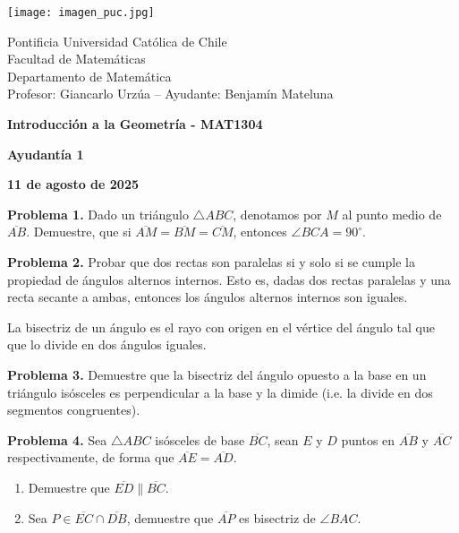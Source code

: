 \documentclass{article}
\begin{document}
\begin{minipage}{2.5cm}
    \texttt{[image: imagen\_puc.jpg]}
\end{minipage}
\begin{minipage}{14cm}
    {\sc Pontificia Universidad Católica de Chile\\
    Facultad de Matemáticas\\
    Departamento de Matemática\\
    Profesor: Giancarlo Urzúa -- Ayudante: Benjamín Mateluna}
\end{minipage}
\vspace{1ex}

{\centerline{\bf Introducción a la Geometría - MAT1304}
\centerline{\bf Ayudantía 1}}
\centerline{\bf 11 de agosto de 2025}

\vspace{1cm}
\noindent\textbf{Problema 1.} Dado un triángulo $\triangle ABC$, denotamos por $M$ al punto medio
de $\overline{AB}$. Demuestre, que si $\overline{AM}=\overline{BM}=\overline{CM}$, entonces 
$\angle BCA=90^{\circ}$.

\vspace{5mm}
\noindent\textbf{Problema 2.} Probar que dos rectas son paralelas si y solo si se cumple la 
propiedad de ángulos alternos internos. Esto es, dadas dos rectas paralelas y una recta secante a
ambas, entonces los ángulos alternos internos son iguales.

\vspace{5mm}
\begin{dfn}
    La bisectriz de un ángulo es el rayo con origen en el vértice del ángulo tal que que lo divide 
    en dos ángulos iguales.
\end{dfn}
\vspace{2mm}
\noindent\textbf{Problema 3.} Demuestre que la bisectriz del ángulo opuesto a la base en un 
triángulo isósceles es perpendicular a la base y la dimide (i.e. la divide en dos segmentos 
congruentes).

\vspace{5mm}
\noindent\textbf{Problema 4.} Sea $\triangle ABC$ isósceles de base $\overline{BC}$, sean $E$ y 
$D$ puntos en $\overline{AB}$ y $\overline{AC}$ respectivamente, de forma que 
$\overline{AE}=\overline{AD}$.
\begin{enumerate}
    \item Demuestre que $\overline{ED}\parallel\overline{BC}$.
    \item Sea $P\in\overline{EC}\cap\overline{DB}$, demuestre que $\overline{AP}$ es bisectriz de
    $\angle BAC$.
\end{enumerate}
\end{document}
